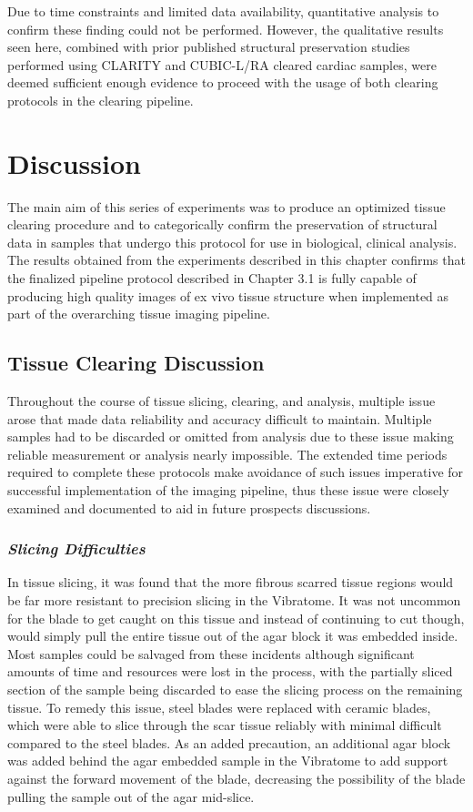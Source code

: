 Due to time constraints and limited data availability, quantitative analysis to confirm these finding could not be performed. However, the qualitative results seen here, combined with prior published structural preservation studies performed using CLARITY and CUBIC-L/RA cleared cardiac samples, were deemed sufficient enough evidence to proceed with the usage of both clearing protocols in the clearing pipeline. 

\section{Discussion}
The main aim of this series of experiments was to produce an optimized tissue clearing procedure and to categorically confirm the preservation of structural data in samples that undergo this protocol for use in biological, clinical analysis. The results obtained from the experiments described in this chapter confirms that the finalized pipeline protocol described in Chapter 3.1 is fully capable of producing high quality images of ex vivo tissue structure when implemented as part of the overarching tissue imaging pipeline. 


\subsection{Tissue Clearing Discussion}
Throughout the course of tissue slicing, clearing, and analysis, multiple issue arose that made data reliability and accuracy difficult to maintain. Multiple samples had to be discarded or omitted from analysis due to these issue making reliable measurement or analysis nearly impossible. The extended time periods required to complete these protocols make avoidance of such issues imperative for successful implementation of the imaging pipeline, thus these issue were closely examined and documented to aid in future prospects discussions.

\subsubsection{\textit{Slicing Difficulties}}
In tissue slicing, it was found that the more fibrous scarred tissue regions would be far more resistant to precision slicing in the Vibratome. It was not uncommon for the blade to get caught on this tissue and instead of continuing to cut though, would simply pull the entire tissue out of the agar block it was embedded inside. Most samples could be salvaged from these incidents although significant amounts of time and resources were lost in the process, with the partially sliced section of the sample being discarded to ease the slicing process on the remaining tissue. To remedy this issue, steel blades were replaced with ceramic blades, which were able to slice through the scar tissue reliably with minimal difficult compared to the steel blades. As an added precaution, an additional agar block was added behind the agar embedded sample in the Vibratome to add support against the forward movement of the blade, decreasing the possibility of the blade pulling the sample out of the agar mid-slice.

